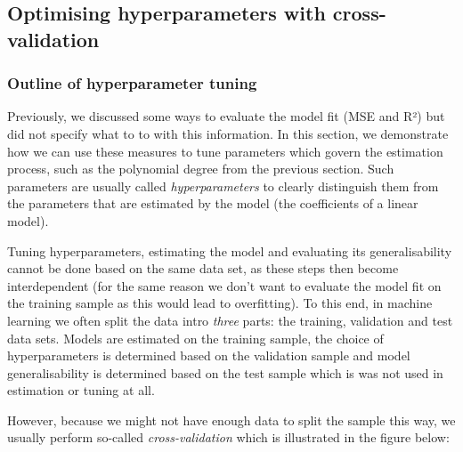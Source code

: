 \documentclass{scrartcl}
\begin{document}
    \begin{center}
    \end{center}
    

\hypertarget{optimising-hyperparameters-with-cross-validation}{%
\subsection{Optimising hyperparameters with
cross-validation}\label{optimising-hyperparameters-with-cross-validation}}

\hypertarget{outline-of-hyperparameter-tuning}{%
\subsubsection{Outline of hyperparameter
tuning}\label{outline-of-hyperparameter-tuning}}

Previously, we discussed some ways to evaluate the model fit (MSE and
R²) but did not specify what to to with this information. In this
section, we demonstrate how we can use these measures to tune parameters
which govern the estimation process, such as the polynomial degree from
the previous section. Such parameters are usually called
\emph{hyperparameters} to clearly distinguish them from the parameters
that are estimated by the model (\eg the coefficients of a linear
model).

Tuning hyperparameters, estimating the model and evaluating its
generalisability cannot be done based on the same data set, as these
steps then become interdependent (for the same reason we don't want to
evaluate the model fit on the training sample as this would lead to
overfitting). To this end, in machine learning we often split the data
intro \emph{three} parts: the training, validation and test data sets.
Models are estimated on the training sample, the choice of
hyperparameters is determined based on the validation sample and model
generalisability is determined based on the test sample which is was not
used in estimation or tuning at all.

However, because we might not have enough data to split the sample this
way, we usually perform so-called \emph{cross-validation} which is
illustrated in the figure below:
\end{document}
